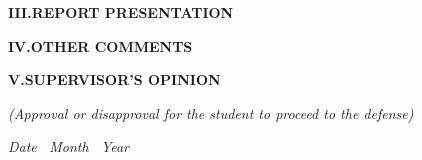 \documentclass[13pt,a4paper]{extreport}
\begin{document}
{\fontsize{13pt}{17pt}\selectfont
{}


\noindent
{\bfseries III.\quad REPORT PRESENTATION}

\evaltwolines
\evaldotline

\vspace{0.7cm}


\noindent
{\bfseries IV.\quad OTHER COMMENTS}

\evaltwolines
\evaldotline

\vspace{0.7cm}


\noindent
{\bfseries V.\quad SUPERVISOR'S OPINION}

\vspace{0.15cm}

\noindent
\textit{(Approval or disapproval for the student to proceed to the defense)}

\vspace{0.3cm}

\evaldotline
\vspace{0.4cm}

\evaldotline
\vspace{0.4cm}

\evaldotline



\vspace{1.0cm}

\begin{flushright}
\begin{minipage}{7.5cm}
    \centering

    {\itshape
    Date \makebox[0.8cm][l]{\dotfill}\,
    Month \makebox[0.8cm][l]{\dotfill}\,
    Year \the\year
    }

    \vspace{0.35cm}


\end{minipage}
\end{flushright}}
\end{document}
